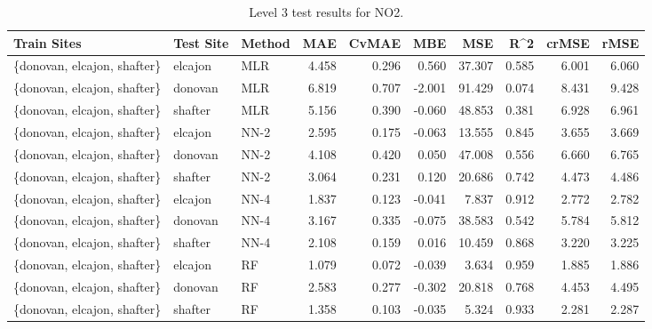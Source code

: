 \begin{table}[h]
\begin{tabular}{lllrrrrrrr}
\toprule
 Train Sites & Test Site & Method &   MAE &  CvMAE &       MBE &     MSE &   R\textasciicircum2 &  crMSE &   rMSE \\
\midrule
\{donovan, elcajon, shafter\} & elcajon & MLR & 4.458 & 0.296 & 0.560 & 37.307 & 0.585 & 6.001 & 6.060\\
\{donovan, elcajon, shafter\} & donovan & MLR & 6.819 & 0.707 & -2.001 & 91.429 & 0.074 & 8.431 & 9.428\\
\{donovan, elcajon, shafter\} & shafter & MLR & 5.156 & 0.390 & -0.060 & 48.853 & 0.381 & 6.928 & 6.961\\
\{donovan, elcajon, shafter\} & elcajon & NN-2 & 2.595 & 0.175 & -0.063 & 13.555 & 0.845 & 3.655 & 3.669\\
\{donovan, elcajon, shafter\} & donovan & NN-2 & 4.108 & 0.420 & 0.050 & 47.008 & 0.556 & 6.660 & 6.765\\
\{donovan, elcajon, shafter\} & shafter & NN-2 & 3.064 & 0.231 & 0.120 & 20.686 & 0.742 & 4.473 & 4.486\\
\{donovan, elcajon, shafter\} & elcajon & NN-4 & 1.837 & 0.123 & -0.041 & 7.837 & 0.912 & 2.772 & 2.782\\
\{donovan, elcajon, shafter\} & donovan & NN-4 & 3.167 & 0.335 & -0.075 & 38.583 & 0.542 & 5.784 & 5.812\\
\{donovan, elcajon, shafter\} & shafter & NN-4 & 2.108 & 0.159 & 0.016 & 10.459 & 0.868 & 3.220 & 3.225\\
\{donovan, elcajon, shafter\} & elcajon & RF & 1.079 & 0.072 & -0.039 & 3.634 & 0.959 & 1.885 & 1.886\\
\{donovan, elcajon, shafter\} & donovan & RF & 2.583 & 0.277 & -0.302 & 20.818 & 0.768 & 4.453 & 4.495\\
\{donovan, elcajon, shafter\} & shafter & RF & 1.358 & 0.103 & -0.035 & 5.324 & 0.933 & 2.281 & 2.287\\
\bottomrule
\end{tabular}
\caption{Level 3 test results for NO2.}
\end{table}
